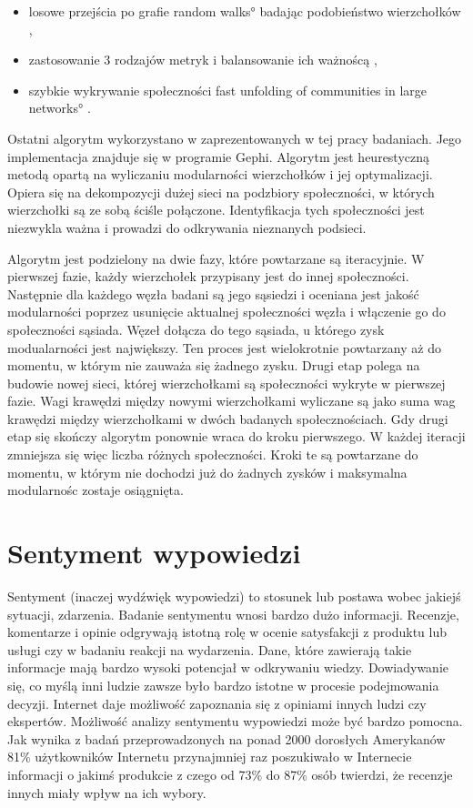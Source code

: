 \begin{itemize}
  \item losowe przejścia po grafie \ang{random walks} badając podobieństwo wierzchołków
   \cite{ComputingCommunitesInLargeNetworks},
  \item zastosowanie 3 rodzajów metryk i balansowanie ich ważnoścą \cite{FindingCommunityStructure},
  \item szybkie wykrywanie społeczności \ang{fast unfolding of communities in
  large networks} \cite{FastUnfoldingOfCommunites}.
\end{itemize}

Ostatni algorytm wykorzystano w zaprezentowanych w tej pracy badaniach.
Jego implementacja znajduje się w programie Gephi. Algorytm jest heurestyczną
metodą opartą na wyliczaniu modularności wierzchołków i jej optymalizacji.
Opiera się na dekompozycji dużej sieci na podzbiory społeczności, w których
wierzchołki są ze sobą ściśle połączone. Identyfikacja tych społeczności jest
niezwykla ważna i prowadzi do odkrywania nieznanych podsieci.

Algorytm jest podzielony na dwie fazy, które powtarzane są iteracyjnie.
W pierwszej fazie, każdy wierzchołek przypisany jest do innej społeczności.
Następnie dla każdego węzła badani są jego sąsiedzi i oceniana jest jakość
modularności poprzez usunięcie aktualnej społeczności węzła i włączenie go do
społeczności sąsiada. Węzeł dołącza do tego sąsiada, u którego zysk
modualarności jest największy. Ten proces jest wielokrotnie powtarzany aż do
momentu, w którym nie zauważa się żadnego zysku.
Drugi etap  polega na budowie nowej sieci, której wierzchołkami są społeczności
wykryte w pierwszej fazie. Wagi krawędzi między nowymi wierzchołkami wyliczane
są jako suma wag krawędzi między wierzchołkami w dwóch badanych społecznościach.
Gdy drugi etap się skończy algorytm ponownie wraca do kroku pierwszego.
W każdej iteracji zmniejsza się więc liczba różnych społeczności.
Kroki te są powtarzane do momentu, w którym nie dochodzi już do żadnych zysków
i maksymalna modularnośc zostaje osiągnięta.



\section{Sentyment wypowiedzi}
Sentyment (inaczej wydźwięk wypowiedzi) to stosunek lub postawa wobec jakiejś
sytuacji, zdarzenia. Badanie sentymentu wnosi bardzo dużo informacji.
Recenzje, komentarze i opinie odgrywają istotną rolę w ocenie satysfakcji z
produktu lub usługi czy w badaniu reakcji na wydarzenia. Dane, które zawierają
takie informacje mają bardzo wysoki potencjał w odkrywaniu wiedzy.
Dowiadywanie się, co myślą inni ludzie zawsze było bardzo istotne w procesie
podejmowania decyzji. Internet daje możliwość zapoznania się z opiniami innych
ludzi czy ekspertów. Możliwość analizy sentymentu wypowiedzi może być bardzo
pomocna. Jak wynika z badań przeprowadzonych na ponad 2000 dorosłych Amerykanów
\cite{pangLee} 81\% użytkowników Internetu przynajmniej raz poszukiwało w
Internecie informacji o jakimś produkcie z czego od 73\% do 87\% osób twierdzi,
że recenzje innych miały wpływ na ich wybory.


